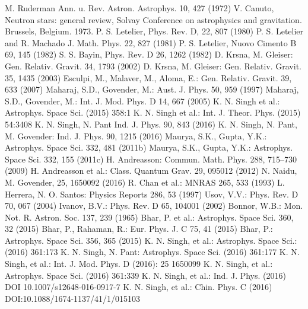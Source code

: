 \documentclass[preprintnumbers,amsmath,amssymb,floatfix,9pt,prd,twocolumn,
superscriptaddress,nofootinbib]{revtex4}
\begin{document}
\begin{thebibliography}{99}

 M. Ruderman Ann. u. Rev. Astron. Astrophys. 10, 427 (1972)
 V. Canuto, Neutron stars: general review, Solvay Conference on astrophysics and gravitation. Brussels, Belgium. 1973.
  P. S. Letelier, Phys. Rev. D, 22, 807 (1980)
  P. S. Letelier and R. Machado J.  Math. Phys. 22, 827 (1981)
  P. S. Letelier, Nuovo Cimento B 69, 145 (1982)
  S. S. Bayin,  Phys. Rev. D  26, 1262 (1982)
  D. Krsna, M. Gleiser: Gen. Relativ. Gravit. 34, 1793  (2002)
  D. Krsna, M. Gleiser: Gen. Relativ. Gravit. 35, 1435  (2003)
   Esculpi, M., Malaver, M., Aloma, E.: Gen. Relativ. Gravit. 39, 633 (2007)
   Maharaj, S.D., Govender, M.: Aust. J. Phys. 50, 959 (1997)
   Maharaj, S.D., Govender, M.: Int. J. Mod. Phys. D 14, 667 (2005)
   K. N. Singh et al.: Astrophys. Space Sci.  (2015) 358:1
   K. N. Singh et al.:  Int. J. Theor. Phys. (2015) 54:3408
   K. N. Singh, N. Pant Ind. J. Phys.  90, 843 (2016)
   K. N. Singh, N. Pant, M. Govender:  Ind. J. Phys.  90, 1215 (2016)
 Maurya, S.K., Gupta, Y.K.: Astrophys. Space Sci. 332, 481 (2011b)
 Maurya, S.K., Gupta, Y.K.: Astrophys. Space Sci. 332, 155 (2011c)
 H. Andreasson: Commun. Math. Phys. 288, 715–730 (2009)
 H. Andreasson et al.: Class. Quantum Grav. 29, 095012  (2012)
  N. Naidu, M. Govender, 25, 1650092 (2016)
  R. Chan et al.: MNRAS 265, 533 (1993)
  L. Herrera, N. O. Santos: Physics Reports 286, 53 (1997)
  Usov, V.V.: Phys. Rev. D 70, 067 (2004)
   Ivanov, B.V.: Phys. Rev. D 65, 104001 (2002)
   Bonnor, W.B.: Mon. Not. R. Astron. Soc. 137, 239 (1965)
 Bhar, P. et  al.:  Astrophys.  Space  Sci.  360, 32 (2015)
 Bhar, P., Rahaman, R.: Eur. Phys. J. C 75, 41 (2015)
 Bhar, P.:  Astrophys. Space Sci. 356, 365 (2015)
  K. N. Singh, et al.: Astrophys.  Space Sci.:  (2016) 361:173
   K. N. Singh, N. Pant: Astrophys.  Space Sci. (2016) 361:177
   K. N. Singh, et al.:  Int. J. Mod. Phys. D (2016):   25 1650099
 K. N. Singh, et al.:  Astrophys.  Space  Sci.  (2016) 361:339
 K. N. Singh, et al.:   Ind. J. Phys. (2016) DOI 10.1007/s12648-016-0917-7
 K. N. Singh, et al.:  Chin. Phys. C (2016)   DOI:10.1088/1674-1137/41/1/015103

\end{thebibliography}
\end{document}
